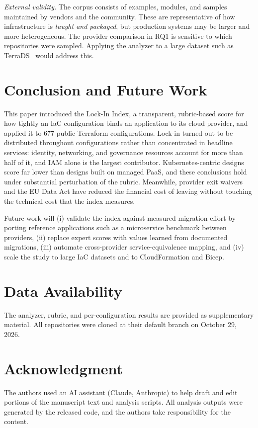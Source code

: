 \documentclass[conference]{IEEEtran}
\begin{document}
\emph{External validity.} The corpus consists of examples, modules, and samples maintained by vendors and the community. These are representative of how infrastructure is \emph{taught and packaged}, but production systems may be larger and more heterogeneous. The provider comparison in RQ1 is sensitive to which repositories were sampled. Applying the analyzer to a large dataset such as TerraDS~\cite{buehler2025} would address this.

\section{Conclusion and Future Work}
This paper introduced the Lock-In Index, a transparent, rubric-based score for how tightly an IaC configuration binds an application to its cloud provider, and applied it to 677 public Terraform configurations. Lock-in turned out to be distributed throughout configurations rather than concentrated in headline services: identity, networking, and governance resources account for more than half of it, and IAM alone is the largest contributor. Kubernetes-centric designs score far lower than designs built on managed PaaS, and these conclusions hold under substantial perturbation of the rubric. Meanwhile, provider exit waivers and the EU Data Act have reduced the financial cost of leaving without touching the technical cost that the index measures.

Future work will (i) validate the index against measured migration effort by porting reference applications such as a microservice benchmark between providers, (ii) replace expert scores with values learned from documented migrations, (iii) automate cross-provider service-equivalence mapping, and (iv) scale the study to large IaC datasets and to CloudFormation and Bicep.

\section*{Data Availability}
The analyzer, rubric, and per-configuration results are provided as supplementary material. All repositories were cloned at their default branch on October 29, 2026.

\section*{Acknowledgment}
The authors used an AI assistant (Claude, Anthropic) to help draft and edit portions of the manuscript text and analysis scripts. All analysis outputs were generated by the released code, and the authors take responsibility for the content.



\end{document}
